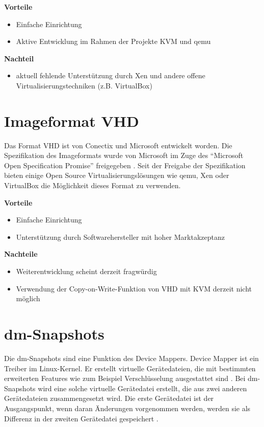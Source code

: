 \textbf{Vorteile}
\begin{itemize}
 \item Einfache Einrichtung
 \item Aktive Entwicklung im Rahmen der Projekte KVM und qemu
\end{itemize}

\textbf{Nachteil}
\begin{itemize}
 \item aktuell fehlende Unterstützung durch Xen und andere offene Virtualisierungstechniken (z.B. VirtualBox)
\end{itemize}

\section{Imageformat VHD}
Das Format VHD ist von Conectix und Microsoft entwickelt worden. Die Spezifikation des Imageformats wurde von Microsoft im Zuge des ``Microsoft Open Specification Promise'' freigegeben \cite{msosp} \cite{vhdspec}. Seit der Freigabe der Spezifikation bieten einige Open Source Virtualisierungslösungen wie qemu, Xen oder VirtualBox die Möglichkeit dieses Format zu verwenden.   

\textbf{Vorteile}
\begin{itemize}
 \item Einfache Einrichtung
 \item Unterstützung durch Softwarehersteller mit hoher Marktakzeptanz
\end{itemize}

\textbf{Nachteile}
\begin{itemize}
 \item Weiterentwicklung scheint derzeit fragwürdig
 \item Verwendung der Copy-on-Write-Funktion von VHD mit KVM derzeit nicht möglich
\end{itemize}

\section{dm-Snapshots}
Die dm-Snapshots sind eine Funktion des Device Mappers. Device Mapper ist ein Treiber im Linux-Kernel. Er erstellt virtuelle Gerätedateien, die mit bestimmten erweiterten Features wie zum Beispiel Verschlüsselung ausgestattet sind \cite{dmmbroz}. Bei dm-Snapshots wird eine solche virtuelle Gerätedatei erstellt, die aus zwei anderen Gerätedateien zusammengesetzt wird. Die erste Gerätedatei ist der Ausgangspunkt, wenn daran Änderungen vorgenommen werden, werden sie als Differenz in der zweiten Gerätedatei gespeichert \cite{dmkerneldoc}. 

